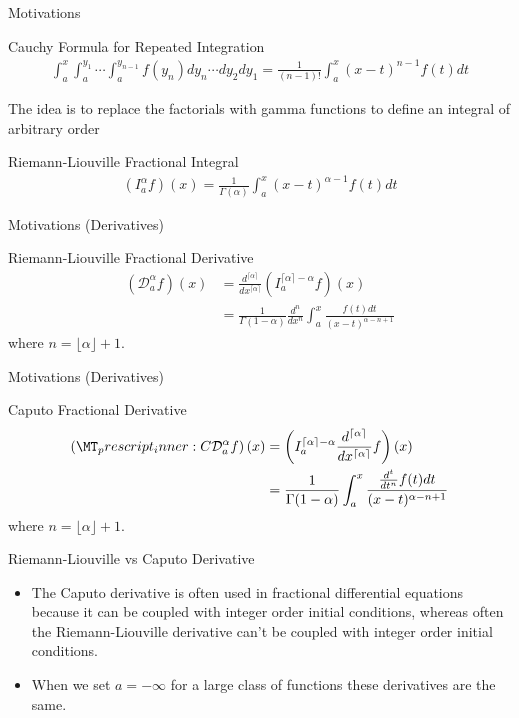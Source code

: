 \documentclass[pdf]{beamer}
\newcommand{\rld}[3]{ \left( \mathcal{D}_{#1}^{#2} #3 \right) }
\newcommand{\rli}[3]{ \left( I_{#1}^{#2} #3 \right) }
\newcommand{\capder}[3]{ \left( \prescript{C}{}{\mathcal{D}_{#1}^{#2}} #3 \right) }
\begin{document}
\begin{frame}{Motivations}
	\begin{block}{Cauchy Formula for Repeated Integration}
		\begin{align*}
			\int_{a}^{x} \int_{a}^{y_1} \cdots \int_a^{y_{n-1}} f(y_n) dy_n \cdots dy_2 dy_1 = \frac{1}{(n-1)!} \int_a^x(x-t)^{n-1}f(t)dt
		\end{align*}
	\end{block}
	\pause
	The idea is to replace the factorials with gamma functions to define an integral of arbitrary order
	\pause
	\begin{block}{Riemann-Liouville Fractional Integral}
		\begin{align*}
			\rli{a}{\alpha}{f}(x) = \frac{1}{\Gamma(\alpha)} \int_a^x(x-t)^{\alpha-1}f(t)dt
		\end{align*}
	\end{block}
\end{frame}

\begin{frame}{Motivations (Derivatives)}
	\begin{block}{Riemann-Liouville Fractional Derivative}
		\begin{align*}
			\rld{a}{\alpha}{f}(x) &= \frac{d^{\lceil \alpha \rceil}}{dx^{\lceil \alpha \rceil}} \rli{a}{\lceil \alpha \rceil - \alpha}{f}(x) \\
				&= \frac{1}{\Gamma(1 - \alpha)}\frac{d^{n}}{dx^n} \int_a^x \frac{f(t)dt}{(x-t)^{\alpha - n + 1}}
		\end{align*}
		where $ n = \lfloor \alpha \rfloor + 1 $.
	\end{block}
\end{frame}

\begin{frame}{Motivations (Derivatives)}
	\begin{block}{Caputo Fractional Derivative}
		\begin{align*}
			\capder{a}{\alpha}{f}(x) &= \rli{a}{\lceil \alpha \rceil - \alpha}{\frac{d^{\lceil \alpha \rceil}}{dx^{\lceil \alpha \rceil}}f}(x) \\
				&= \frac{1}{\Gamma(1 - \alpha)} \int_a^x \frac{\frac{d^{t}}{dt^n}f(t)dt}{(x-t)^{\alpha - n + 1}}
		\end{align*}
		where $ n = \lfloor \alpha \rfloor + 1 $.
	\end{block}
\end{frame}
\begin{frame}{ Riemann-Liouville vs Caputo Derivative}
    \begin{itemize}
	\item The Caputo derivative is often used in fractional differential equations because it
	can be coupled with integer order initial conditions, whereas often the Riemann-Liouville
	derivative can't be coupled with integer order initial conditions.
   
    \item When we set $ a = -\infty $ for a large class of functions these derivatives are the same.
    \end{itemize}
\end{frame}
\end{document}
